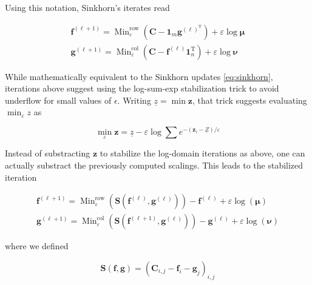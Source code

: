 Using this notation, Sinkhorn's iterates read

\begin{equation}
  \begin{array}{l}
    {\mathbf{f}^{(\ell+1)}=\operatorname{Min}_{\varepsilon}^{\mathrm{row}}\left(\mathbf{C}-\mathbf{1}_{m} \mathbf{g}^{(\ell)^{\mathrm{T}}}\right)+\varepsilon \log \mathbf{\mu}} \\
    {\mathbf{g}^{(\ell+1)}=\operatorname{Min}_{\varepsilon}^{\mathrm{col}}\left(\mathbf{C}-\mathbf{f}^{(\ell)} \mathbf{1}_{n}^{\mathrm{T}}\right)+\varepsilon \log \mathbf{\nu}}
    \end{array}
\end{equation}

While mathematically equivalent to the Sinkhorn
updates \ref{eq:sinkhorn}, iterations above suggest using the log-sum-exp stabilization
trick to avoid underflow for small values of $\epsilon$. Writing $\underline{z}=\min \mathbf{z}$, that trick suggests
evaluating $\min_{\varepsilon} z$ as

\begin{equation}
  \operatorname{min}_{\varepsilon} \mathbf{z}=\underline{z}-\varepsilon \log \sum e^{-\left(\mathbf{z}_{i}-\underline{Z}\right) / \varepsilon}
\end{equation}

Instead of substracting $\mathbf{z}$ to stabilize the log-domain iterations as above, one can actually substract the previously computed scalings. This leads to the stabilized iteration

\begin{equation}
  \begin{array}{l}
    {\mathbf{f}^{(\ell+1)}=\operatorname{Min}_{\varepsilon}^{\mathrm{row}}\left(\mathbf{S}\left(\mathbf{f}^{(\ell)}, \mathbf{g}^{(\ell)}\right)\right)-\mathbf{f}^{(\ell)}+\varepsilon \log (\mathbf{\mu})} \\
    {\mathbf{g}^{(\ell+1)}=\operatorname{Min}_{\varepsilon}^{\mathrm{col}}\left(\mathbf{S}\left(\mathbf{f}^{(\ell+1)}, \mathbf{g}^{(\ell)}\right)\right)-\mathbf{g}^{(\ell)}+\varepsilon \log (\mathbf{\nu})}
    \end{array}
\end{equation}

where we defined 

\begin{equation}
  \mathbf{S}(\mathbf{f}, \mathbf{g})=\left(\mathbf{C}_{i, j}-\mathbf{f}_{i}-\mathbf{g}_{j}\right)_{i, j}
\end{equation}

